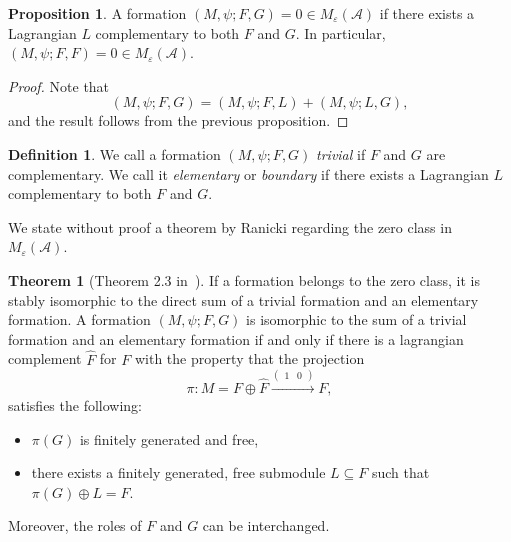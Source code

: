 \documentclass{article}
\theoremstyle{definition}
\newtheorem{defn}[theorem]{Definition}
\newtheorem{prop}[theorem]{Proposition}
\newcommand{\CA}{{ \mathcal A}}
\newtheorem{thm}{Theorem}
\begin{document}
\begin{prop}
    A formation $(M, \psi; F, G)=0\in M_\varepsilon(\CA)$ if there exists a Lagrangian $L$ complementary to both $F$ and $G$. In particular, $(M, \psi; F, F)=0\in M_\varepsilon(\CA).$ 
\end{prop}
\begin{proof}
    Note that $$(M, \psi; F, G)=(M, \psi; F, L)+(M, \psi; L, G),$$ and the result follows from the previous proposition. 
\end{proof}
\begin{defn}
    We call a formation $(M, \psi; F, G)$ \emph{trivial} if $F$ and $G$ are complementary. We call it \emph{elementary} or \emph{boundary} if there exists a Lagrangian $L$ complementary to both $F$ and $G$.
\end{defn}
We state without proof a theorem by Ranicki regarding the zero class in $M_\varepsilon(\CA)$.
\begin{thm}[Theorem 2.3 in~\cite{ranicki1973algebraic}]
    If a formation belongs to the zero class, it is stably isomorphic to the direct sum of a trivial formation and an elementary formation. A formation \( (M, \psi; F, G) \) is isomorphic to the sum of a trivial formation and an elementary formation if and only if there is a lagrangian complement \( \widehat{F} \) for \( F \) with the property that the projection
\[
\pi \colon M = F \oplus \widehat{F} \xrightarrow{\begin{pmatrix} 1 & 0 \end{pmatrix}} F,
\]
satisfies the following:

\begin{itemize}
    \item \( \pi(G) \) is finitely generated and free,
    \item there exists a finitely generated, free submodule \( L \subseteq F \) such that \( \pi(G) \oplus L = F \).
\end{itemize}

\noindent Moreover, the roles of \( F \) and \( G \) can be interchanged.
\end{thm}


\end{document}
